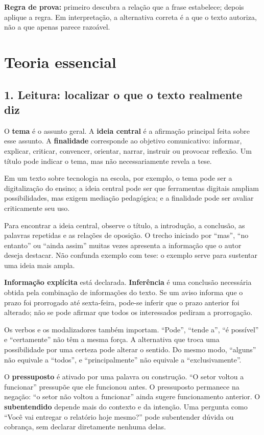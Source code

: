 \documentclass[11pt,a4paper]{article}
\begin{document}
\textbf{Regra de prova:} primeiro descubra a relação que a frase estabelece; depois aplique a regra. Em interpretação, a alternativa correta é a que o texto autoriza, não a que apenas parece razoável.

\section*{Teoria essencial}

\subsection*{1. Leitura: localizar o que o texto realmente diz}

O \textbf{tema} é o assunto geral. A \textbf{ideia central} é a afirmação principal feita sobre esse assunto. A \textbf{finalidade} corresponde ao objetivo comunicativo: informar, explicar, criticar, convencer, orientar, narrar, instruir ou provocar reflexão. Um título pode indicar o tema, mas não necessariamente revela a tese.

Em um texto sobre tecnologia na escola, por exemplo, o tema pode ser a digitalização do ensino; a ideia central pode ser que ferramentas digitais ampliam possibilidades, mas exigem mediação pedagógica; e a finalidade pode ser avaliar criticamente seu uso.

Para encontrar a ideia central, observe o título, a introdução, a conclusão, as palavras repetidas e as relações de oposição. O trecho iniciado por “mas”, “no entanto” ou “ainda assim” muitas vezes apresenta a informação que o autor deseja destacar. Não confunda exemplo com tese: o exemplo serve para sustentar uma ideia mais ampla.

\textbf{Informação explícita} está declarada. \textbf{Inferência} é uma conclusão necessária obtida pela combinação de informações do texto. Se um aviso informa que o prazo foi prorrogado até sexta-feira, pode-se inferir que o prazo anterior foi alterado; não se pode afirmar que todos os interessados pediram a prorrogação.

Os verbos e os modalizadores também importam. “Pode”, “tende a”, “é possível” e “certamente” não têm a mesma força. A alternativa que troca uma possibilidade por uma certeza pode alterar o sentido. Do mesmo modo, “alguns” não equivale a “todos”, e “principalmente” não equivale a “exclusivamente”.

O \textbf{pressuposto} é ativado por uma palavra ou construção. “O setor voltou a funcionar” pressupõe que ele funcionou antes. O pressuposto permanece na negação: “o setor não voltou a funcionar” ainda sugere funcionamento anterior. O \textbf{subentendido} depende mais do contexto e da intenção. Uma pergunta como “Você vai entregar o relatório hoje mesmo?” pode subentender dúvida ou cobrança, sem declarar diretamente nenhuma delas.
\end{document}
